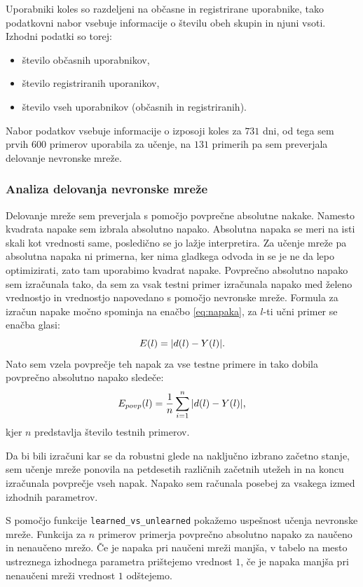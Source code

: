 \documentclass[mat1]{fmfdelo}
\begin{document}
Uporabniki koles so razdeljeni na občasne in registrirane uporabnike, tako podatkovni nabor vsebuje informacije o številu obeh skupin in njuni vsoti. Izhodni podatki so torej:
\begin{itemize}
	\item število občasnih uporabnikov,
	\item število registriranih uporanikov,
	\item število vseh uporabnikov (občasnih in registriranih).
\end{itemize}

Nabor podatkov vsebuje informacije o izposoji koles za $731$ dni, od tega sem prvih $600$ primerov uporabila za učenje, na $131$ primerih pa sem preverjala delovanje nevronske mreže.
%
\subsubsection{Analiza delovanja nevronske mreže}
Delovanje mreže sem preverjala s pomočjo povprečne absolutne nakake. Namesto kvadrata napake sem izbrala absolutno napako. Absolutna napaka se meri na isti skali kot vrednosti same, posledično se jo lažje interpretira. Za učenje mreže pa absolutna napaka ni primerna, ker nima gladkega odvoda in se je ne da lepo optimizirati, zato tam uporabimo kvadrat napake. Povprečno absolutno napako sem izračunala tako, da sem za vsak testni primer izračunala napako med želeno vrednostjo in vrednostjo napovedano s pomočjo nevronske mreže. Formula za izračun napake močno spominja na enačbo \eqref{eq:napaka}, za $l$-ti učni primer se enačba glasi:
%
\begin{equation*}
E(l) = |d(l)-Y(l)|\text.
\end{equation*}
%
 Nato sem vzela povprečje teh napak za vse testne primere in tako dobila povprečno absolutno napako sledeče:
 \begin{equation}
 E_{povp}(l) = \frac{1}{n}\sum_{i=1}^{n}|d(l)-Y(l)|\text,
 \end{equation}
 kjer $n$ predstavlja število testnih primerov.
 
  Da bi bili izračuni kar se da robustni glede na naključno izbrano začetno stanje, sem učenje mreže ponovila na petdesetih različnih začetnih utežeh in na koncu izračunala povprečje vseh napak. Napako sem računala posebej za vsakega izmed izhodnih parametrov.

S pomočjo funkcije \texttt{learned\-\_vs\-\_unlearned} pokažemo uspešnost učenja nevronske mreže. Funkcija za $n$ primerov primerja povprečno absolutno napako za naučeno in nenaučeno mrežo. Če je napaka pri naučeni mreži manjša, v tabelo na mesto ustreznega izhodnega parametra prištejemo vrednost $1$, če je napaka manjša pri nenaučeni mreži vrednost $1$ odštejemo.
\end{document}
